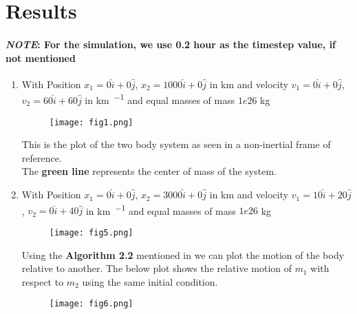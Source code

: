 \section{Results}

\paragraph{\textit{NOTE}: For the simulation, we use 0.2 hour as the timestep value, if not mentioned}

\drawBorder

\begin{enumerate}

    \item
        With Position $x_1 = 0\hat{i} + 0\hat{j}$, $x_2 = 1000\hat{i} + 0\hat{j}$ in \si{\km} and velocity $v_1 = 0\hat{i} + 0\hat{j}$, $v_2 = 60\hat{i} + 60\hat{j}$ in \si{\km \per \sec} and equal masses of mass $1e26$ kg

        \begin{figure}[h!]
            \centering
            \texttt{[image: fig1.png]}
        \end{figure}

        This is the plot of the two body system as seen in a non-inertial frame of reference. \\The \textbf{green line} represents the center of mass of the system.

        \newpage

\drawBorder

    \item

        With Position $x_1 = 0\hat{i} + 0\hat{j}$, $x_2 = 3000\hat{i} + 0\hat{j}$ in km and velocity $v_1 = 10\hat{i} + 20\hat{j}$, $v_2 = 0\hat{i} + 40\hat{j}$ in \si{\km \per \sec} and equal masses of mass $1e26$ kg

        \begin{figure}[h!]
            \centering
            \texttt{[image: fig5.png]}
        \end{figure}

        Using the \textbf{Algorithm 2.2} mentioned in \textcite{orbital_mechanics_4ed} we can plot the motion of the body relative to another. The below plot shows the relative motion of $m_1$ with respect to $m_2$ using the same initial condition.

        \begin{figure}[h!]
            \centering
            \texttt{[image: fig6.png]}
        \end{figure}


\end{enumerate}
